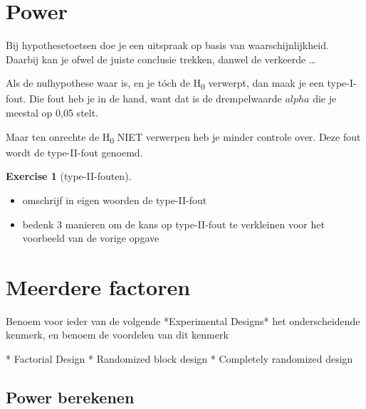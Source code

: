 \documentclass[
  letterpaper,
  DIV=11,
  numbers=noendperiod]{scrreprt}
\newenvironment{Shaded}{\begin{snugshade}}{\end{snugshade}}
\newcommand{\NormalTok}[1]{\textcolor[rgb]{0.00,0.23,0.31}{#1}}
\providecommand{\tightlist}{%
  \setlength{\itemsep}{0pt}\setlength{\parskip}{0pt}}\usepackage{longtable,booktabs,array}
\theoremstyle{definition}
\newtheorem{exercise}{Exercise}[chapter]
\theoremstyle{remark}
\begin{document}
\hypertarget{power}{%
\section{Power}\label{power}}

Bij hypothesetoetsen doe je een uitspraak op basis van
waarschijnlijkheid. Daarbij kan je ofwel de juiste conclusie trekken,
danwel de verkeerde \ldots{}

Als de nulhypothese waar is, en je tóch de H\textsubscript{0} verwerpt,
dan maak je een type-I-fout. Die fout heb je in de hand, want dat is de
drempelwaarde \(alpha\) die je meestal op 0,05 stelt.

Maar ten onrechte de H\textsubscript{0} NIET verwerpen heb je minder
controle over. Deze fout wordt de type-II-fout genoemd.

\leavevmode{}%
\begin{exercise}[type-II-fouten]\label{exr-type2fout}

\begin{itemize}
\tightlist
\item
  omschrijf in eigen woorden de type-II-fout
\item
  bedenk 3 manieren om de kans op type-II-fout te verkleinen voor het
  voorbeeld van de vorige opgave
\end{itemize}

\end{exercise}

\hypertarget{meerdere-factoren}{%
\section{Meerdere factoren}\label{meerdere-factoren}}

\begin{Shaded}
\begin{Highlighting}[]

\NormalTok{Benoem voor ieder van de volgende *Experimental Designs* het onderscheidende kenmerk, en benoem de voordelen van dit kenmerk}

\NormalTok{* Factorial Design}
\NormalTok{* Randomized block design}
\NormalTok{* Completely randomized design}
\end{Highlighting}
\end{Shaded}

\hypertarget{power-berekenen}{%
\subsection{Power berekenen}\label{power-berekenen}}
\end{document}
